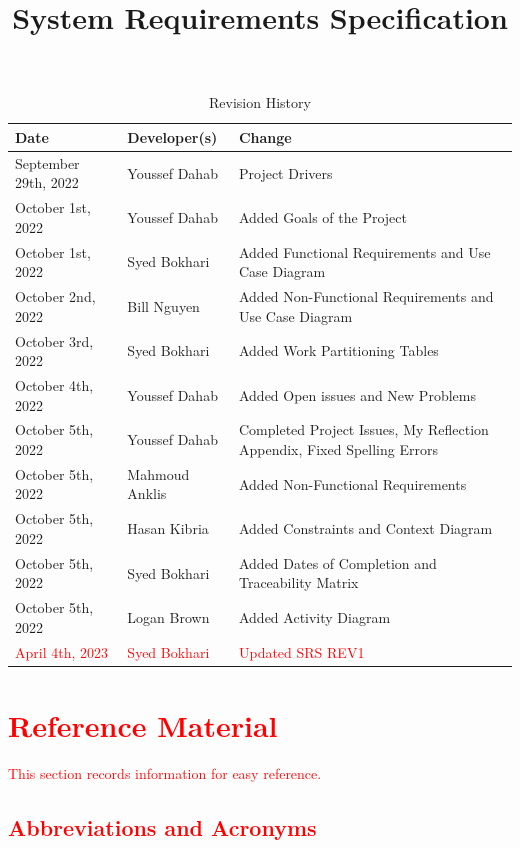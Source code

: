 \documentclass[12pt,letterpaper]{article}
\title{System Requirements Specification\\\progname}
\author{\authname}
\date{}
\begin{document}
\maketitle

\begin{table}[hp]
	\caption{Revision History} \label{TblRevisionHistory}
	\begin{tabularx}{\textwidth}{llX}
		\toprule
		\textbf{Date} & \textbf{Developer(s)} & \textbf{Change}\\
		\midrule
		September 29th, 2022 & Youssef Dahab & Project Drivers \\
		October 1st, 2022 & Youssef Dahab & Added Goals of the Project \\
		October 1st, 2022 & Syed Bokhari & Added Functional Requirements and Use Case Diagram \\
		October 2nd, 2022 & Bill Nguyen & Added Non-Functional Requirements and Use Case Diagram \\
		October 3rd, 2022 & Syed Bokhari & Added Work Partitioning Tables \\
		October 4th, 2022 & Youssef Dahab & Added Open issues and New Problems \\
		October 5th, 2022 & Youssef Dahab & Completed Project Issues, My Reflection Appendix, Fixed Spelling Errors\\
		October 5th, 2022 & Mahmoud Anklis & Added Non-Functional Requirements\\
		October 5th, 2022 & Hasan Kibria & Added Constraints and Context Diagram \\
		October 5th, 2022 & Syed Bokhari & Added Dates of Completion and Traceability Matrix \\
		October 5th, 2022 & Logan Brown & Added Activity Diagram\\
		\textcolor{red}{April 4th, 2023} & \textcolor{red}{Syed Bokhari} & \textcolor{red}{Updated SRS REV1}\\
		\bottomrule
	\end{tabularx}
\end{table}

\newpage
\tableofcontents

\newpage
\section{\textcolor{red}{Reference Material}}

\textcolor{red}{This section records information for easy reference.}

\subsection{\textcolor{red}{Abbreviations and Acronyms}}
\end{document}
